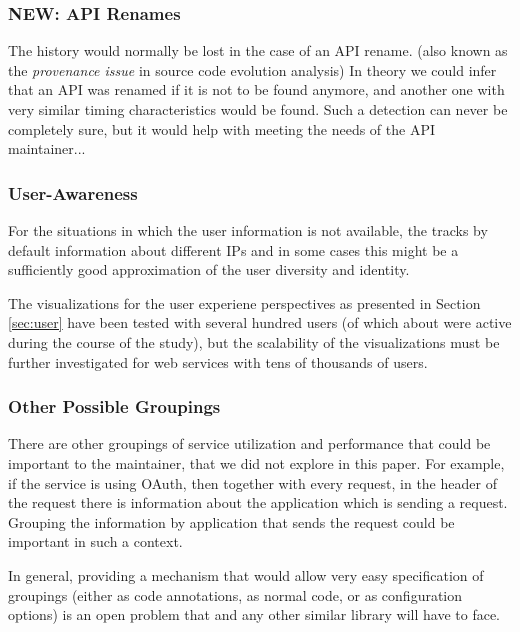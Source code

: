   \subsubsection{NEW: API Renames}


    The history would normally be lost in the case of an API rename. (also known as the {\em provenance issue} in source code evolution analysis)
    In theory we could infer that an API was renamed if it is not to be found anymore, and another one with very similar timing characteristics would be found. Such a detection can never be completely sure, but it would help with meeting the needs of the API maintainer... 

  \subsubsection{User-Awareness }

    For the situations in which the user information is not available, the \tool tracks by default information about different IPs and in some cases this might be a sufficiently good approximation of the user diversity and identity. 

    The visualizations for the user experiene perspectives as presented in Section \ref{sec:user} have been tested with several hundred users (of which about \activeUserCount were active during the course of the study), but the scalability of the visualizations must be further investigated for web services with tens of thousands of users.


  \subsubsection{Other Possible Groupings}

    There are other groupings of service utilization and performance that could be important to the maintainer, that we did not explore in this paper. For example, if the service is using OAuth, then together with every request, in the header of the request there is information about the application which is sending a request. Grouping the information by application that sends the request could be important in such a context. 

    In general, providing a mechanism that would allow very easy specification of groupings (either as code annotations, as normal code, or as configuration options) is an open problem that \tool and any other similar library will have to face.

